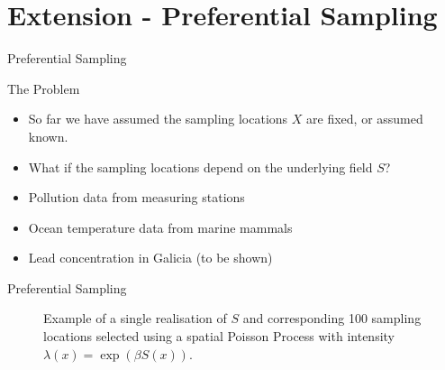 \documentclass{beamer}
\begin{document}
\section{Extension - Preferential Sampling}

\begin{frame}{Preferential Sampling}
\begin{block}{The Problem}
\begin{itemize}
\item So far we have assumed the sampling locations $X$ are fixed, or assumed known.
\item What if the sampling locations depend on the underlying field $S$?
\end{itemize}
\end{block}

\begin{example}
\begin{itemize}
\item Pollution data from measuring stations
\item Ocean temperature data from marine mammals
\item Lead concentration in Galicia (to be shown)
\end{itemize}
\end{example}
\end{frame}

\begin{frame}{Preferential Sampling}

\begin{figure}
\centering
\caption{Example of a single realisation of $S$ and corresponding 100 sampling locations selected using a spatial Poisson Process with intensity $\lambda(x)=\exp(\beta S(x))$.\label{fig:PrefSimPlot}}
\end{figure}
\end{frame}
\end{document}

